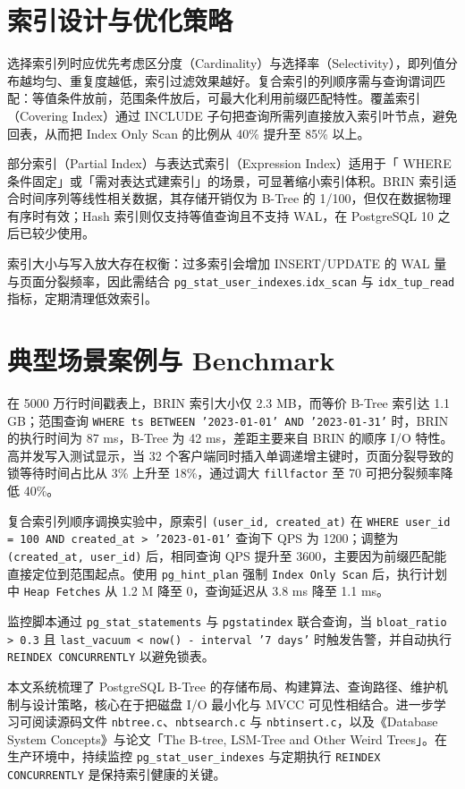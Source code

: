 \chapter{索引设计与优化策略}
选择索引列时应优先考虑区分度（Cardinality）与选择率（Selectivity），即列值分布越均匀、重复度越低，索引过滤效果越好。复合索引的列顺序需与查询谓词匹配：等值条件放前，范围条件放后，可最大化利用前缀匹配特性。覆盖索引（Covering Index）通过 INCLUDE 子句把查询所需列直接放入索引叶节点，避免回表，从而把 Index Only Scan 的比例从 40\%{} 提升至 85\%{} 以上。\par
部分索引（Partial Index）与表达式索引（Expression Index）适用于「 WHERE 条件固定」或「需对表达式建索引」的场景，可显著缩小索引体积。BRIN 索引适合时间序列等线性相关数据，其存储开销仅为 B-Tree 的 1/100，但仅在数据物理有序时有效；Hash 索引则仅支持等值查询且不支持 WAL，在 PostgreSQL 10 之后已较少使用。\par
索引大小与写入放大存在权衡：过多索引会增加 INSERT/UPDATE 的 WAL 量与页面分裂频率，因此需结合 \texttt{pg\_{}stat\_{}user\_{}indexes}.\texttt{idx\_{}scan} 与 \texttt{idx\_{}tup\_{}read} 指标，定期清理低效索引。\par
\chapter{典型场景案例与 Benchmark}
在 5000 万行时间戳表上，BRIN 索引大小仅 2.3 MB，而等价 B-Tree 索引达 1.1 GB；范围查询 \texttt{WHERE ts BETWEEN '2023-01-01' AND '2023-01-31'} 时，BRIN 的执行时间为 87 ms，B-Tree 为 42 ms，差距主要来自 BRIN 的顺序 I/O 特性。高并发写入测试显示，当 32 个客户端同时插入单调递增主键时，页面分裂导致的锁等待时间占比从 3\%{} 上升至 18\%{}，通过调大 \texttt{fillfactor} 至 70 可把分裂频率降低 40\%{}。\par
复合索引列顺序调换实验中，原索引 \texttt{(user\_{}id, created\_{}at)} 在 \texttt{WHERE user\_{}id = 100 AND created\_{}at > '2023-01-01'} 查询下 QPS 为 1200；调整为 \texttt{(created\_{}at, user\_{}id)} 后，相同查询 QPS 提升至 3600，主要因为前缀匹配能直接定位到范围起点。使用 \texttt{pg\_{}hint\_{}plan} 强制 \texttt{Index Only Scan} 后，执行计划中 \texttt{Heap Fetches} 从 1.2 M 降至 0，查询延迟从 3.8 ms 降至 1.1 ms。\par
监控脚本通过 \texttt{pg\_{}stat\_{}statements} 与 \texttt{pgstatindex} 联合查询，当 \texttt{bloat\_{}ratio > 0.3} 且 \texttt{last\_{}vacuum < now() - interval '7 days'} 时触发告警，并自动执行 \texttt{REINDEX CONCURRENTLY} 以避免锁表。\par
本文系统梳理了 PostgreSQL B-Tree 的存储布局、构建算法、查询路径、维护机制与设计策略，核心在于把磁盘 I/O 最小化与 MVCC 可见性相结合。进一步学习可阅读源码文件 \texttt{nbtree.c}、\texttt{nbtsearch.c} 与 \texttt{nbtinsert.c}，以及《Database System Concepts》与论文「The B-tree, LSM-Tree and Other Weird Trees」。在生产环境中，持续监控 \texttt{pg\_{}stat\_{}user\_{}indexes} 与定期执行 \texttt{REINDEX CONCURRENTLY} 是保持索引健康的关键。\par
